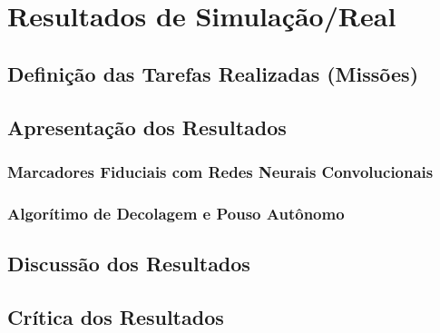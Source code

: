 \chapter{Resultados de Simulação/Real}

\section{Definição das Tarefas Realizadas (Missões)}

\section{Apresentação dos Resultados}

	\subsection{Marcadores Fiduciais com Redes Neurais Convolucionais}

	\subsection{Algorítimo de Decolagem e Pouso Autônomo}

\section{Discussão dos Resultados}

\section{Crítica dos Resultados}